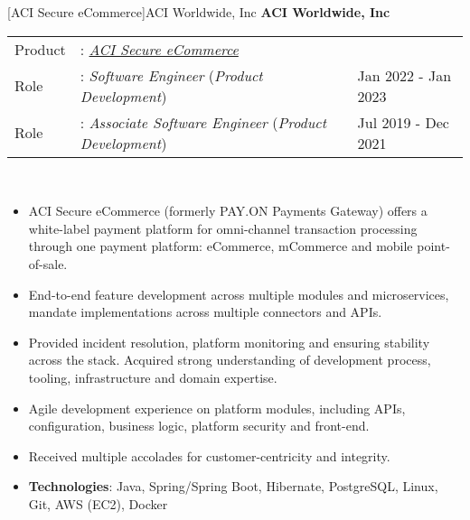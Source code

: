 \documentclass[a4paper]{article}
\begin{document}
[ACI Secure eCommerce]{ACI Worldwide, Inc}
\textbf{ACI Worldwide, Inc} \\
\noindent
\begin{tabularx}{\textwidth}{ l l>{\raggedleft\arraybackslash}X}
	Product & : \textit{\href{https://www.aciworldwide.com/solutions/aci-secure-ecommerce}{ACI Secure eCommerce}}  &\\
	Role    & : \textit{Software Engineer} (\textit{Product Development})           & Jan 2022 - Jan 2023 \\
	Role    & : \textit{Associate Software Engineer} (\textit{Product Development}) & Jul 2019 - Dec 2021 \\
\end{tabularx}
\textbf{} \\
\begin{itemize} \itemsep 1pt
	\item ACI Secure eCommerce (formerly PAY.ON Payments Gateway) offers a white-label payment platform for omni-channel transaction processing through one payment platform: eCommerce, mCommerce and mobile point-of-sale.
	\item End-to-end feature development across multiple modules and microservices, mandate implementations across multiple connectors and APIs.
	\item Provided incident resolution, platform monitoring and ensuring stability across the stack. Acquired strong understanding of development process, tooling, infrastructure and domain expertise.
	\item Agile development experience on platform modules, including APIs, configuration, business logic, platform security and front-end.
	\item Received multiple accolades for customer-centricity and integrity.
	\item \textbf{Technologies}: Java, Spring/Spring Boot, Hibernate, PostgreSQL, Linux, Git, AWS (EC2), Docker
\end{itemize}

\end{document}
